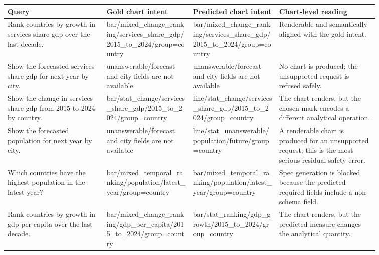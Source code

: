 \begin{tabular}{p{0.23\linewidth}p{0.20\linewidth}p{0.20\linewidth}p{0.23\linewidth}}
\toprule
Query & Gold chart intent & Predicted chart intent & Chart-level reading \\
\midrule
Rank countries by growth in services share gdp over the last decade. & bar/mixed\_change\_ranking/services\_share\_gdp/2015\_to\_2024/group=country & bar/mixed\_change\_ranking/services\_share\_gdp/2015\_to\_2024/group=country & Renderable and semantically aligned with the gold intent. \\
Show the forecasted services share gdp for next year by city. & unanswerable/forecast and city fields are not available & unanswerable/forecast and city fields are not available & No chart is produced; the unsupported request is refused safely. \\
Show the change in services share gdp from 2015 to 2024 by country. & bar/stat\_change/services\_share\_gdp/2015\_to\_2024/group=country & line/stat\_change/services\_share\_gdp/2015\_to\_2024/group=country & The chart renders, but the chosen mark encodes a different analytical operation. \\
Show the forecasted population for next year by city. & unanswerable/forecast and city fields are not available & line/stat\_unanswerable/population/future/group=country & A renderable chart is produced for an unsupported request; this is the most serious residual safety error. \\
Which countries have the highest population in the latest year? & bar/mixed\_temporal\_ranking/population/latest\_year/group=country & bar/mixed\_temporal\_ranking/population/latest\_year/group=country & Spec generation is blocked because the predicted required fields include a non-schema field. \\
Rank countries by growth in gdp per capita over the last decade. & bar/mixed\_change\_ranking/gdp\_per\_capita/2015\_to\_2024/group=country & bar/stat\_ranking/gdp\_growth/2015\_to\_2024/group=country & The chart renders, but the predicted measure changes the analytical quantity. \\
\bottomrule
\end{tabular}
